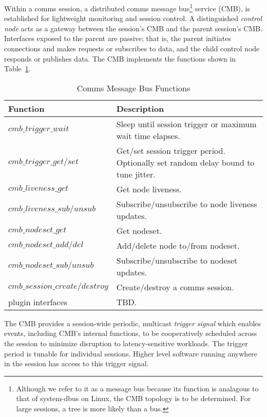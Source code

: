 Within a comms session, a distributed comms message bus\footnote{
Although we refer to it as a message bus because its function
is analagous to that of system-dbus on Linux, the CMB topology is to
be determined.  For large sessions, a tree is more likely than a bus.}
service (CMB), is established for lightweight monitoring and session control.
A distinguished {\em control node} acts as a gateway between the
session's CMB and the parent session's CMB.  Interfaces exposed to the
parent are passive; that is, the parent initiates connections and
makes requests or subscribes to data, and the child control node
responds or publishes data.  The CMB implements the functions shown
in Table~\ref{TabCMBFun}.

\begin{table}
  \centering
  \begin{tabular}{| l | p{} |}\hline
  \textbf{Function} & \textbf{Description} \\
  \hline
  $cmb\_trigger\_wait $ &
	Sleep until session trigger or maximum wait time elapses. \\
  $cmb\_trigger\_get/set$ &
	Get/set session trigger period.
	Optionally set random delay bound to tune jitter.\\
  \hline
  $cmb\_liveness\_get$ &
	Get node liveness. \\
  $cmb\_liveness\_sub/unsub$ &
	Subscribe/unsubscribe to node liveness updates. \\
  \hline
  $cmb\_nodeset\_get$ &
	Get nodeset. \\
  $cmb\_nodeset\_add/del$ &
	Add/delete node to/from nodeset. \\
  $cmb\_nodeset\_sub/unsub$ &
	Subscribe/unsubscribe to nodeset updates. \\
  \hline
  $cmb\_session\_create/destroy$ &
	Create/destroy a comms session. \\
  \hline
  plugin interfaces &
	TBD. \\
  \hline
  \end{tabular}
  \caption{Comms Message Bus Functions}
  \label{TabCMBFun}
\end{table}
%

The CMB provides a session-wide periodic, multicast {\em trigger signal}
which enables events, including CMB's internal functions, to be cooperatively
scheduled across the session to minimize disruption to latency-sensitive
workloads.  The trigger period is tunable for individual sessions.
Higher level software running anywhere in the session has access to
this trigger signal.

